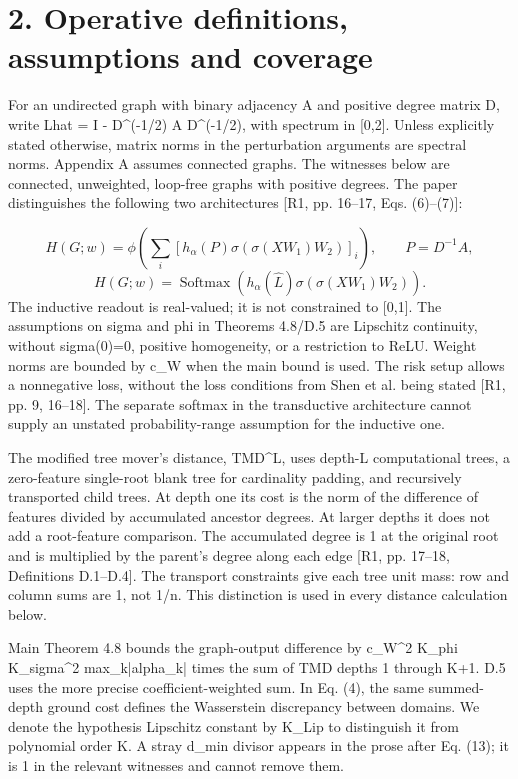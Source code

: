 \documentclass[10pt]{article}
\begin{document}
\section*{2. Operative definitions, assumptions and coverage}
For an undirected graph with binary adjacency A and positive degree matrix D, write Lhat = I - D\textasciicircum{}(-1/2) A D\textasciicircum{}(-1/2), with spectrum in [0,2]. Unless explicitly stated otherwise, matrix norms in the perturbation arguments are spectral norms. Appendix A assumes connected graphs. The witnesses below are connected, unweighted, loop-free graphs with positive degrees. The paper distinguishes the following two architectures [R1, pp. 16–17, Eqs. (6)–(7)]:\par
\[H(G;w)=\phi\!\left(\sum_i[h_\alpha(P)\sigma(\sigma(XW_1)W_2)]_i\right),\qquad P=D^{-1}A,\] \[H(G;w)=\operatorname{Softmax}\!\left(h_\alpha(\widehat L)\sigma(\sigma(XW_1)W_2)\right).\] The inductive readout is real-valued; it is not constrained to [0,1]. The assumptions on sigma and phi in Theorems 4.8/D.5 are Lipschitz continuity, without sigma(0)=0, positive homogeneity, or a restriction to ReLU. Weight norms are bounded by c\_W when the main bound is used. The risk setup allows a nonnegative loss, without the loss conditions from Shen et al. being stated [R1, pp. 9, 16–18]. The separate softmax in the transductive architecture cannot supply an unstated probability-range assumption for the inductive one.\par
The modified tree mover’s distance, TMD\textasciicircum{}L, uses depth-L computational trees, a zero-feature single-root blank tree for cardinality padding, and recursively transported child trees. At depth one its cost is the norm of the difference of features divided by accumulated ancestor degrees. At larger depths it does not add a root-feature comparison. The accumulated degree is 1 at the original root and is multiplied by the parent’s degree along each edge [R1, pp. 17–18, Definitions D.1–D.4]. The transport constraints give each tree unit mass: row and column sums are 1, not 1/n. This distinction is used in every distance calculation below.\par
Main Theorem 4.8 bounds the graph-output difference by c\_W\textasciicircum{}2 K\_phi K\_sigma\textasciicircum{}2 max\_k|alpha\_k| times the sum of TMD depths 1 through K+1. D.5 uses the more precise coefficient-weighted sum. In Eq. (4), the same summed-depth ground cost defines the Wasserstein discrepancy between domains. We denote the hypothesis Lipschitz constant by K\_Lip to distinguish it from polynomial order K. A stray d\_min divisor appears in the prose after Eq. (13); it is 1 in the relevant witnesses and cannot remove them.\par
\end{document}
